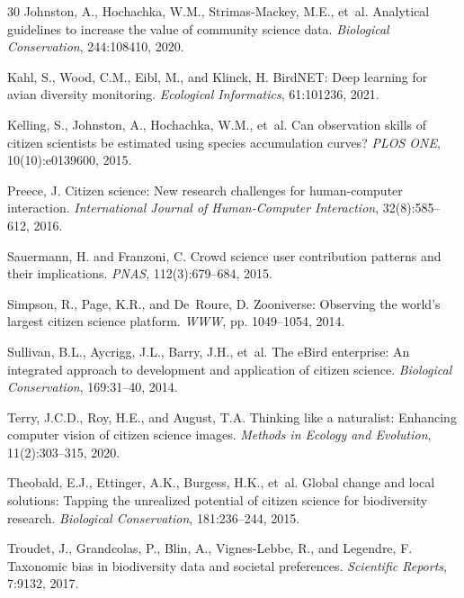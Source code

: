 \begin{thebibliography}{30}
Johnston, A., Hochachka, W.M., Strimas-Mackey, M.E., et~al.
\newblock Analytical guidelines to increase the value of community science data.
\newblock \emph{Biological Conservation}, 244:108410, 2020.

Kahl, S., Wood, C.M., Eibl, M., and Klinck, H.
\newblock BirdNET: Deep learning for avian diversity monitoring.
\newblock \emph{Ecological Informatics}, 61:101236, 2021.

Kelling, S., Johnston, A., Hochachka, W.M., et~al.
\newblock Can observation skills of citizen scientists be estimated using species
  accumulation curves?
\newblock \emph{PLOS ONE}, 10(10):e0139600, 2015.

Preece, J.
\newblock Citizen science: New research challenges for human-computer
  interaction.
\newblock \emph{International Journal of Human-Computer Interaction},
  32(8):585--612, 2016.

Sauermann, H. and Franzoni, C.
\newblock Crowd science user contribution patterns and their implications.
\newblock \emph{PNAS}, 112(3):679--684, 2015.

Simpson, R., Page, K.R., and De~Roure, D.
\newblock Zooniverse: Observing the world's largest citizen science platform.
\newblock \emph{WWW}, pp. 1049--1054, 2014.

Sullivan, B.L., Aycrigg, J.L., Barry, J.H., et~al.
\newblock The eBird enterprise: An integrated approach to development and
  application of citizen science.
\newblock \emph{Biological Conservation}, 169:31--40, 2014.

Terry, J.C.D., Roy, H.E., and August, T.A.
\newblock Thinking like a naturalist: Enhancing computer vision of citizen
  science images.
\newblock \emph{Methods in Ecology and Evolution}, 11(2):303--315, 2020.

Theobald, E.J., Ettinger, A.K., Burgess, H.K., et~al.
\newblock Global change and local solutions: Tapping the unrealized potential
  of citizen science for biodiversity research.
\newblock \emph{Biological Conservation}, 181:236--244, 2015.

Troudet, J., Grandcolas, P., Blin, A., Vignes-Lebbe, R., and Legendre, F.
\newblock Taxonomic bias in biodiversity data and societal preferences.
\newblock \emph{Scientific Reports}, 7:9132, 2017.


\end{thebibliography}

